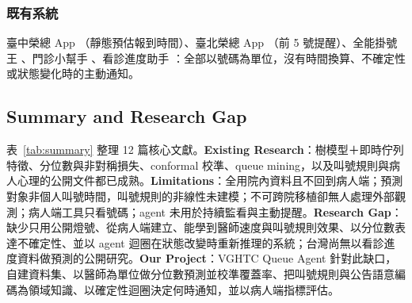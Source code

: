\documentclass[11pt,twocolumn]{article}
\begin{document}
\subsubsection{既有系統}
臺中榮總 App \cite{vghtcapp}（靜態預估報到時間）、臺北榮總 App \cite{vghtpeapp}（前 5 號提醒）、全能掛號王 \cite{seedoctor}、門診小幫手 \cite{docbot2020}、看診進度助手 \cite{opdhelper}：全部以號碼為單位，沒有時間換算、不確定性或狀態變化時的主動通知。

\subsection{Summary and Research Gap}
表~\ref{tab:summary} 整理 12 篇核心文獻。\textbf{Existing Research}：樹模型＋即時佇列特徵、分位數與非對稱損失、conformal 校準、queue mining，以及叫號規則與病人心理的公開文件都已成熟。\textbf{Limitations}：全用院內資料且不回到病人端；預測對象非個人叫號時間，叫號規則的非線性未建模；不可跨院移植卻無人處理外部觀測；病人端工具只看號碼；agent 未用於持續監看與主動提醒。\textbf{Research Gap}：缺少只用公開燈號、從病人端建立、能學到醫師速度與叫號規則效果、以分位數表達不確定性、並以 agent 迴圈在狀態改變時重新推理的系統；台灣尚無以看診進度資料做預測的公開研究。\textbf{Our Project}：VGHTC Queue Agent 針對此缺口，自建資料集、以醫師為單位做分位數預測並校準覆蓋率、把叫號規則與公告語意編碼為領域知識、以確定性迴圈決定何時通知，並以病人端指標評估。
\end{document}
